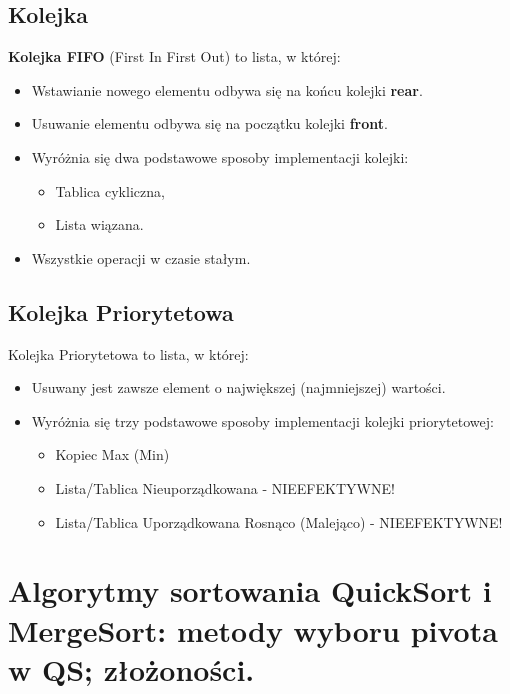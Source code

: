 \documentclass[main.tex]{subfiles}
\begin{document}
    \subsection{Kolejka}
    \begin{definition}
        \textbf{Kolejka FIFO} (First In First Out) to lista, w której:
        \begin{itemize}[noitemsep]
            \item Wstawianie nowego elementu odbywa się na końcu kolejki \textbf{rear}.
            \item Usuwanie elementu odbywa się na początku kolejki \textbf{front}.
            \item Wyróżnia się dwa podstawowe sposoby implementacji kolejki:
            \begin{itemize}
                \item Tablica cykliczna,
                \item Lista wiązana.
            \end{itemize}
            \item Wszystkie operacji w czasie stałym.
        \end{itemize}
    \end{definition}


    \subsection{Kolejka Priorytetowa}
    \begin{definition}
        Kolejka Priorytetowa to lista, w której:
        \begin{itemize}
            \item Usuwany jest zawsze element o największej (najmniejszej) wartości.
            \item Wyróżnia się trzy podstawowe sposoby implementacji kolejki priorytetowej:
            \begin{itemize}
                \item Kopiec Max (Min)
                \item Lista/Tablica Nieuporządkowana - NIEEFEKTYWNE!
                \item Lista/Tablica Uporządkowana Rosnąco (Malejąco) - NIEEFEKTYWNE!
            \end{itemize}
        \end{itemize}
    \end{definition}


    \section{Algorytmy sortowania QuickSort i MergeSort: metody wyboru pivota w QS; złożoności.}
\end{document}
